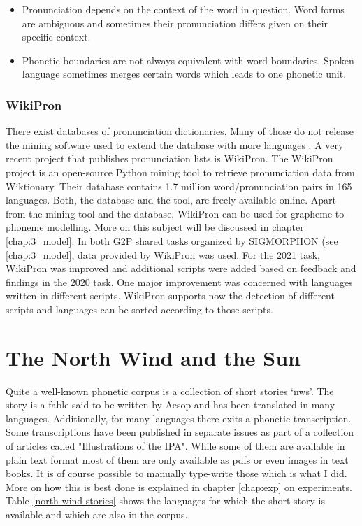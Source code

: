 \begin{itemize}
\item Pronunciation depends on the context of the word in question. Word forms are ambiguous and sometimes their pronunciation differs given on their specific context.  
\item Phonetic boundaries are not always equivalent with word boundaries. Spoken language sometimes merges certain words which leads to one phonetic unit. 
\end{itemize} 


\subsubsection*{WikiPron}
There exist databases of pronunciation dictionaries. Many of those do not release the mining software used to extend the database with more languages \citep{Lee&Ashby.2020}. A very recent project that publishes pronunciation lists is WikiPron. The WikiPron project \citep{Lee&Ashby.2020} is an open-source Python mining tool to retrieve pronunciation data from Wiktionary. Their database contains 1.7 million word/pronunciation pairs in 165 languages. Both, the database and the tool, are freely available online. Apart from the mining tool and the database, WikiPron can be used for grapheme-to-phoneme modelling. More on this subject will be discussed in chapter \ref{chap:3_model}.
In both G2P shared tasks organized by SIGMORPHON (see \ref{chap:3_model}, data provided by WikiPron was used. For the 2021 task, WikiPron was improved and additional scripts were added based on feedback and findings in the 2020 task. One major improvement was concerned with languages written in different scripts. WikiPron supports now the detection of different scripts and languages can be sorted according to those scripts.


\section{The North Wind and the Sun}
\label{nws}
Quite a well-known phonetic corpus is a collection of short stories `\ac{nws}'. The story is a fable said to be written by Aesop and has been translated in many languages. Additionally, for many languages there exits a phonetic transcription. 
Some transcriptions have been published in separate issues as part of a collection of articles called "Illustrations of the IPA". While some of them are available in plain text format most of them are only available as pdfs or even images in text books. It is of course possible to manually type-write those which is what I did. More on how this is best done is explained in chapter \ref{chap:exp} on experiments. Table \ref{north-wind-stories} shows the languages for which the short story is available and which are also in the corpus.
\citep{baird_evans_greenhill_2021}


 	